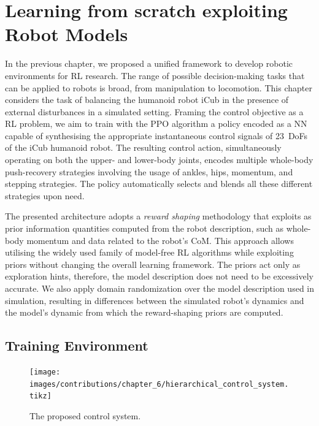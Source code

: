 \chapter{Learning from scratch exploiting Robot Models}
\label{ch:learning_from_scratch}

In the previous chapter, we proposed a unified framework to develop robotic environments for \ac{RL} research.
The range of possible decision-making tasks that can be applied to robots is broad, from manipulation to locomotion.
This chapter considers the task of balancing the humanoid robot iCub in the presence of external disturbances in a simulated setting.
Framing the control objective as a \ac{RL} problem, we aim to train with the \ac{PPO} algorithm a policy encoded as a \ac{NN} capable of synthesising the appropriate instantaneous control signals of 23~\acp{DoF} of the iCub humanoid robot.
The resulting control action, simultaneously operating on both the upper- and lower-body joints, encodes multiple whole-body push-recovery strategies involving the usage of ankles, hips, momentum, and stepping strategies.
The policy automatically selects and blends all these different strategies upon need.

The presented architecture adopts a \emph{reward shaping} methodology that exploits as prior information quantities computed from the robot description, such as whole-body momentum and data related to the robot's \ac{CoM}.
This approach allows utilising the widely used family of model-free \ac{RL} algorithms while exploiting priors without changing the overall learning framework.
The priors act only as exploration hints, therefore, the model description does not need to be excessively accurate.
We also apply domain randomization over the model description used in simulation, resulting in differences between the simulated robot's dynamics and the model's dynamic from which the reward-shaping priors are computed.

\newpage
\section{Training Environment}

\begin{figure}
    \centering
    \texttt{[image: images/contributions/chapter\_6/hierarchical\_control\_system.tikz]}
    \caption{The proposed control system.}
    \label{fig:hierarchical}
\end{figure}

